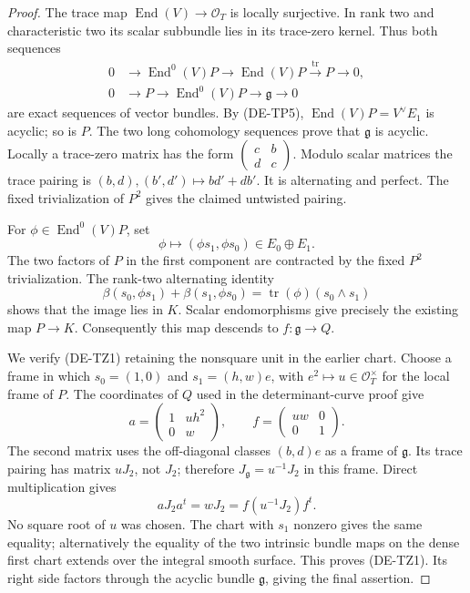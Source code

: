 \begin{proof}
The trace map $\operatorname{End}(V)\to\mathcal O_T$ is locally
surjective. In rank two and characteristic two its scalar subbundle
lies in its trace-zero kernel. Thus both sequences
\[
\begin{split}
0&\longrightarrow\operatorname{End}^0(V)P
 \longrightarrow\operatorname{End}(V)P\xrightarrow{\operatorname{tr}}P
 \longrightarrow0,\\
0&\longrightarrow P\longrightarrow\operatorname{End}^0(V)P
 \longrightarrow\mathfrak g\longrightarrow0
\end{split}
\]
are exact sequences of vector bundles. By (DE-TP5),
$\operatorname{End}(V)P=V^\vee E_1$ is acyclic; so is $P$.
The two long cohomology sequences prove that $\mathfrak g$ is acyclic.
Locally a trace-zero matrix has the form
$\left(\begin{smallmatrix}c&b\\d&c\end{smallmatrix}\right)$.
Modulo scalar matrices the trace pairing is
$(b,d),(b',d')\mapsto bd'+db'$. It is alternating and perfect.
The fixed trivialization of $P^2$ gives the claimed untwisted pairing.

For $\phi\in\operatorname{End}^0(V)P$, set
\[
                         \phi\longmapsto(\phi s_1,\phi s_0)
                                     \in E_0\oplus E_1.
\]
The two factors of $P$ in the first component are contracted by the
fixed $P^2$ trivialization. The rank-two alternating identity
\[
 \beta(s_0,\phi s_1)+\beta(s_1,\phi s_0)
                          =\operatorname{tr}(\phi)(s_0\wedge s_1)
\]
shows that the image lies in $K$. Scalar endomorphisms give precisely
the existing map $P\to K$. Consequently this map descends to
$f:\mathfrak g\to Q$.

We verify (DE-TZ1) retaining the nonsquare unit in the earlier chart.
Choose a frame in which $s_0=(1,0)$ and $s_1=(h,w)e$, with
$e^2\mapsto u\in\mathcal O_T^\times$ for the local frame of $P$.
The coordinates of $Q$ used in the determinant-curve proof give
\[
 a=\begin{pmatrix}1&u h^2\\0&w\end{pmatrix},\qquad
 f=\begin{pmatrix}uw&0\\0&1\end{pmatrix}.
\]
The second matrix uses the off-diagonal classes $(b,d)e$ as a frame
of $\mathfrak g$. Its trace pairing has matrix $uJ_2$, not $J_2$;
therefore $J_{\mathfrak g}=u^{-1}J_2$ in this frame. Direct multiplication gives
\[
                  aJ_2a^t=wJ_2=f(u^{-1}J_2)f^t.
\]
No square root of $u$ was chosen. The chart with $s_1$ nonzero gives
the same equality; alternatively the equality of the two intrinsic
bundle maps on the dense first chart extends over the integral
smooth surface. This proves (DE-TZ1). Its right side factors through
the acyclic bundle $\mathfrak g$, giving the final assertion.
\end{proof}

